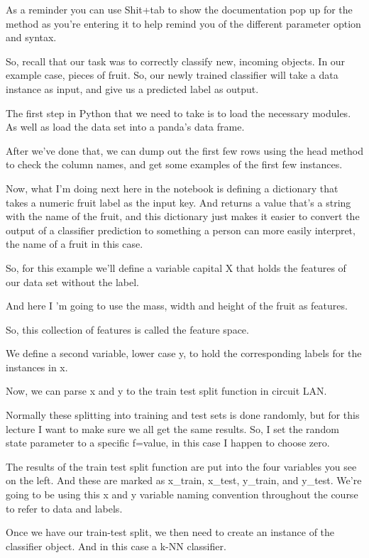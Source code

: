 \begin{multicols}{2}
As a reminder you can use Shit+tab to show the documentation pop up for the method as you're entering it to help remind you of the different parameter option and syntax. 

So, recall that our task was to correctly classify new, incoming objects. In our example case, pieces of fruit. So, our newly trained classifier will take a data instance as input, and give us a predicted label as output. 

The first step in Python that we need to take is to load the necessary modules. As well as load the data set into a panda's data frame. 

After we've done that, we can dump out the first few rows using the head method to check the column names, and get some examples of the first few instances. 

Now, what I'm doing next here in the notebook is defining a dictionary that takes a numeric fruit label as the input key. And returns a value that's a string with the name of the fruit, and this dictionary just makes it easier to convert the output of a classifier prediction to something a person can more easily interpret, the name of a fruit in this case. 

So, for this example we'll define a variable capital X that holds the features of our data set without the label. 

And here I 'm going to use the mass, width and height of the fruit as features. 

So, this collection of features is called the feature space. 

We define a second variable, lower case y, to hold the corresponding labels for the instances in x. 

Now, we can parse x and y to the train test split function in circuit LAN. 

Normally these splitting into training and test sets is done randomly, but for this lecture I want to make sure we all get the same results. So, I set the random state parameter to a specific f=value, in this case I happen to choose zero. 

The results of the train test split function are put into the four variables you see on the left. And these are marked as x_train, x_test, y_train, and y_test. We're going to be using this x and y variable naming convention throughout the course to refer to data and labels. 

Once we have our train-test split, we then need to create an instance of the classifier object. And in this case a k-NN classifier. 


\end{multicols}
